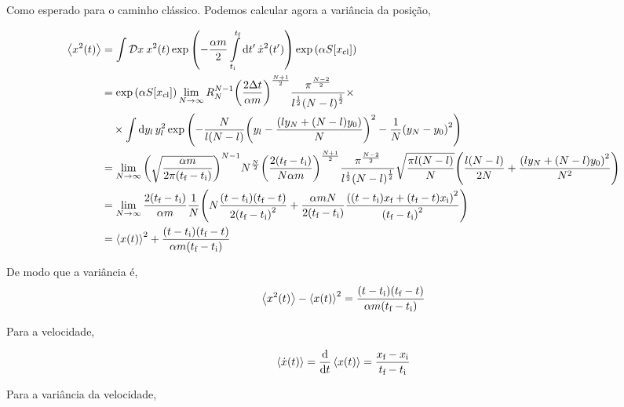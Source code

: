 \documentclass[twoside]{amsart}
\newcommand{\Dd}[1]{\mathcal D #1\: }
\numberwithin{equation}{section}
\begin{document}
Como esperado para o caminho clássico. Podemos calcular agora a variância da posição,

\begin{align*}
    \expval{x^2\qty(t)}&=\int\Dd xx^2\qty(t)\exp\qty(-\frac{\alpha m}{2}\int\limits_{t_{\textnormal i}}^{t_{\textnormal f}}\dd{t'}\dot x^2\qty(t'))\exp\qty(\alpha S\qty[x_{\textnormal{cl}}])\\
    &=\exp\qty(\alpha S\qty[x_{\textnormal{cl}}])\lim\limits_{N\rightarrow\infty}R_N^{N-1}\qty(\frac{2\Delta t}{\alpha m})^{\frac {N+1}{2}}\frac{\pi^{\frac{N-2}{2}}}{l^{\frac12}\qty(N-l)^{\frac12}}\times\\
    &\quad\times\int\dd{y_l}y^2_l\exp\qty(-\frac{N}{l\qty(N-l)}\qty(y_l-\frac{\qty(ly_N+\qty(N-l)y_0)}{N})^2-\frac1N\qty(y_N-y_0)^2)\\
    &=\lim\limits_{N\rightarrow\infty}\qty(\sqrt{\frac{\alpha m}{2\pi\qty(t_{\textnormal f}-t_{\textnormal i})}})^{N-1}N^\frac{N}{2}\qty(\frac{2\qty( t_{\textnormal f}-t_{\textnormal i})}{N\alpha m})^{\frac{N+1}{2}}\frac{\pi^{\frac{N-2}{2}}}{l^{\frac12}\qty(N-l)^{\frac12}}\sqrt{\frac{\pi l\qty(N-l)}{N}}\qty(\frac{l\qty(N-l)}{2N}+\frac{\qty(ly_N+\qty(N-l)y_0)^2}{N^2})\\
    &=\lim\limits_{N\rightarrow\infty}\frac{2\qty( t_{\textnormal f}-t_{\textnormal i})}{\alpha m}\frac{1}{N}\qty(N\frac{\qty(t-t_{\textnormal i})\qty(t_{\textnormal f}-t)}{2\qty(t_{\textnormal f}-t_{\textnormal i})^2}+\frac{\alpha m N}{2\qty(t_{\textnormal f}-t_{\textnormal i})}\frac{\qty(\qty(t-t_{\textnormal i})x_{\textnormal f}+\qty(t_{\textnormal f}-t)x_{\textnormal i})^2}{\qty(t_{\textnormal f}-t_{\textnormal i})^2})\\
    &=\expval{x\qty(t)}^2+\frac{\qty(t-t_{\textnormal i})\qty(t_{\textnormal f}-t)}{\alpha m\qty(t_{\textnormal f}-t_{\textnormal i})}
\end{align*}

De modo que a variância é, $$\expval{x^2\qty(t)}-\expval{x\qty(t)}^2=\frac{\qty(t-t_{\textnormal i})\qty(t_{\textnormal f}-t)}{\alpha m\qty(t_{\textnormal f}-t_{\textnormal i})}$$

Para a velocidade,

$$\expval{\dot x\qty(t)}=\dv{}{t}\expval{x\qty(t)}=\frac{x_{\textnormal f}-x_{\textnormal i}}{t_{\textnormal f}-t_{\textnormal i}}$$

Para a variância da velocidade,
\end{document}
